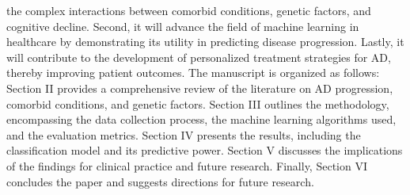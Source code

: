 \documentclass[conference]{IEEEtran}
\begin{document}
the complex interactions between comorbid conditions, genetic factors, and cognitive decline. Second, it will advance the field of machine learning in healthcare by demonstrating its utility in predicting disease progression. Lastly, it will contribute to the development of personalized treatment strategies for AD, thereby improving patient outcomes. The manuscript is organized as follows: Section II provides a comprehensive review of the literature on AD progression, comorbid conditions, and genetic factors. Section III outlines the methodology, encompassing the data collection process, the machine learning algorithms used, and the evaluation metrics. Section IV presents the results, including the classification model and its predictive power. Section V discusses the implications of the findings for clinical practice and future research. Finally, Section VI concludes the paper and suggests directions for future research.
\end{document}
